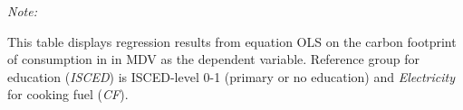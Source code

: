\begin{table}[htbp!]
\begin{adjustbox}{width = 1\textwidth, max height = 0.95\textheight, center}
\begin{threeparttable}[b]
         \begin{tablenotes}\item \medskip \textit{Note:}
            \item This table displays regression results from equation OLS on the carbon footprint of consumption in  in MDV as the dependent variable.  Reference group for education (\textit{ISCED}) is ISCED-level 0-1 (primary or no education) and \textit{Electricity} for cooking fuel (\textit{CF}).
         \end{tablenotes}
      \end{threeparttable}
   \end{adjustbox}
\end{table}



